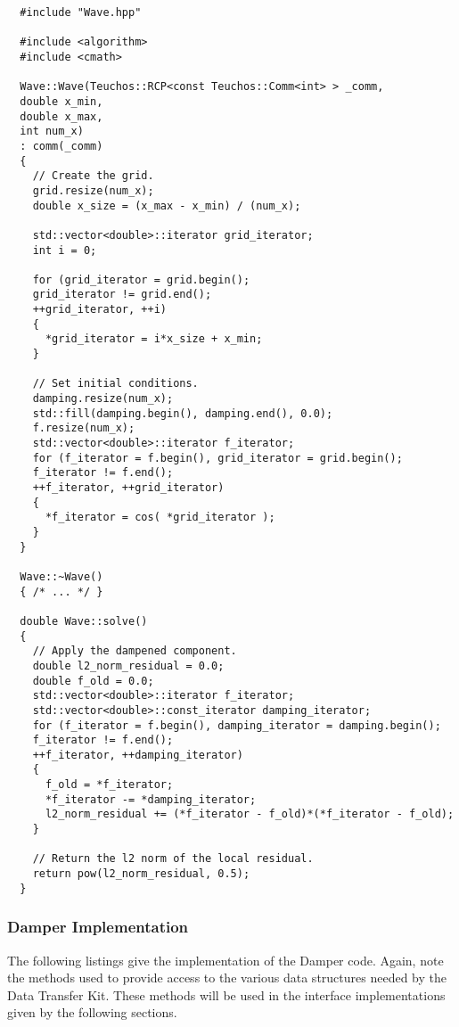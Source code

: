 \documentclass[letterpaper]{article}
\begin{document}
\begin{lstlisting}
  #include "Wave.hpp"

  #include <algorithm>
  #include <cmath>

  Wave::Wave(Teuchos::RCP<const Teuchos::Comm<int> > _comm,
  double x_min,
  double x_max,
  int num_x)
  : comm(_comm)
  {
    // Create the grid.
    grid.resize(num_x);
    double x_size = (x_max - x_min) / (num_x);

    std::vector<double>::iterator grid_iterator;
    int i = 0;

    for (grid_iterator = grid.begin();
    grid_iterator != grid.end();
    ++grid_iterator, ++i)
    {
      *grid_iterator = i*x_size + x_min;
    }

    // Set initial conditions.
    damping.resize(num_x);
    std::fill(damping.begin(), damping.end(), 0.0);
    f.resize(num_x);
    std::vector<double>::iterator f_iterator;
    for (f_iterator = f.begin(), grid_iterator = grid.begin();
    f_iterator != f.end();
    ++f_iterator, ++grid_iterator)
    {
      *f_iterator = cos( *grid_iterator );
    }
  }

  Wave::~Wave()
  { /* ... */ }

  double Wave::solve()
  {
    // Apply the dampened component.
    double l2_norm_residual = 0.0;
    double f_old = 0.0;
    std::vector<double>::iterator f_iterator;
    std::vector<double>::const_iterator damping_iterator;
    for (f_iterator = f.begin(), damping_iterator = damping.begin();
    f_iterator != f.end();
    ++f_iterator, ++damping_iterator)
    {
      f_old = *f_iterator;
      *f_iterator -= *damping_iterator;
      l2_norm_residual += (*f_iterator - f_old)*(*f_iterator - f_old);
    }
    
    // Return the l2 norm of the local residual.
    return pow(l2_norm_residual, 0.5);
  }
\end{lstlisting}

\subsubsection{Damper Implementation}
The following listings give the implementation of the Damper
code. Again, note the methods used to provide access to the various
data structures needed by the Data Transfer Kit. These methods will be
used in the interface implementations given by the following sections.
\end{document}
